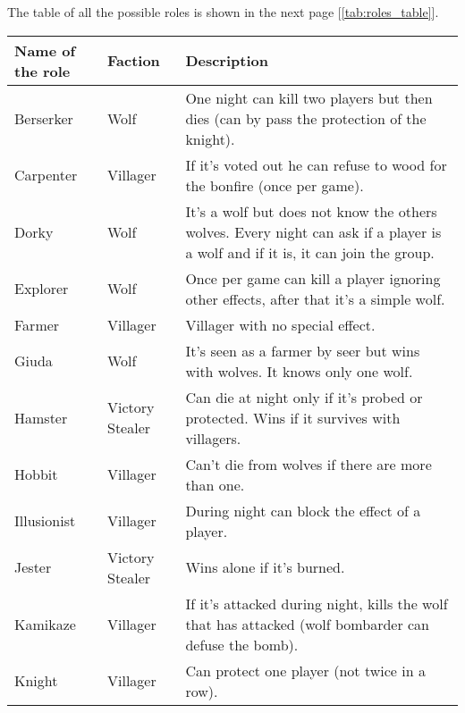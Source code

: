 The table of all the possible roles is shown in the next page [\ref{tab:roles_table}]. 
\begin{center}
    \begin{table}[]
    \centering
    \begin{tabular}{ | m{2.8cm} | m{2.5cm}| m{10cm} |}
        
        \hline
        \centering \textbf{Name of the role} & \centering \textbf{Faction} & \textbf{Description} \\
        \hline
        \centering Berserker & \centering Wolf & One night can kill two players but then dies (can by pass the protection of the knight). \\
        \hline
        \centering Carpenter & \centering Villager & If it's voted out he can refuse to wood for the bonfire (once per game). \\
        \hline
        \centering Dorky & \centering Wolf & It's a wolf but does not know the others wolves. Every night can ask if a player is a wolf and if it is, it can join the group. \\
        \hline
        \centering Explorer & \centering Wolf & Once per game can kill a player ignoring other effects, after that it's a simple wolf. \\
        \hline
        \centering Farmer & \centering Villager & Villager with no special effect. \\
        \hline
        \centering Giuda & \centering Wolf & It's seen as a farmer by seer but wins with wolves. It knows only one wolf. \\
        \hline
        \centering Hamster & \centering Victory Stealer & Can die at night only if it's probed or protected. Wins if it survives with villagers. \\
        \hline
        \centering Hobbit & \centering Villager & Can't die from wolves if there are more than one.\\
        \hline
        \centering Illusionist & \centering Villager & During night can block the effect of a player. \\
        \hline
        \centering Jester & \centering Victory Stealer & Wins alone if it's burned. \\
        \hline
        \centering Kamikaze & \centering Villager & If it's attacked during night, kills the wolf that has attacked (wolf bombarder can defuse the bomb).\\
        \hline
        \centering Knight & \centering Villager & Can protect one player (not twice in a row).\\

\end{tabular}
\end{table}
\end{center}
